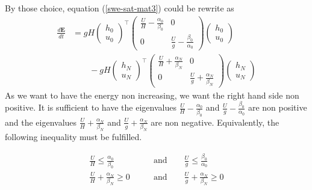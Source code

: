 \documentclass{article}
\theoremstyle{definition}
\begin{document}
    By those choice, equation (\ref{swe-sat-mat3}) could be rewrite as
    \begin{align}
        \frac{d\mathbf{E}}{dt}  &=     gH
        \begin{pmatrix}
            h_0 \\ u_0
        \end{pmatrix}^\top 
        \begin{pmatrix}
        \frac{U}{H} - \frac{\alpha_0}{\beta_0}& 0 \\
        0 & \frac{U}{g} - \frac{\beta_0}{\alpha_0}
        \end{pmatrix}
        \begin{pmatrix}
            h_0 \\ u_0
        \end{pmatrix} \nonumber \\
        & \qquad -gH
        \begin{pmatrix}
            h_N \\ u_N
        \end{pmatrix}^\top 
        \begin{pmatrix}
        \frac{U}{H} +\frac{\alpha_N}{\beta_N}& 0 \\
        0 & \frac{U}{g} + \frac{\alpha_N}{\beta_N}
        \end{pmatrix}
        \begin{pmatrix}
            h_N \\ u_N
        \end{pmatrix}
    \end{align}
    As we want to have the energy non increasing, 
    we want the right hand side non positive. 
    It is sufficient to have the eigenvalues 
    $\frac{U}{H} - \frac{\alpha_0}{\beta_0}$ and 
    $\frac{U}{g} - \frac{\beta_0}{\alpha_0}$ are non positive
    and the eigenvalues
    $\frac{U}{H} +\frac{\alpha_N}{\beta_N}$ and 
    $\frac{U}{g} + \frac{\alpha_N}{\beta_N}$
    are non negative. Equivalently, the following inequality must be fulfilled.

    \begin{align}
        \label{boundarycondition_tau0}        
        \frac{U}{H} \leq \frac{\alpha_0}{\beta_0} \qquad &\text{and} \qquad \frac{U}{g} \leq \frac{\beta_0}{\alpha_0} \\
        \label{boundarycondition_tauN}
        \frac{U}{H} +\frac{\alpha_N}{\beta_N} \geq 0 \qquad &\text{and} \qquad \frac{U}{g} + \frac{\alpha_N}{\beta_N} \geq 0
    \end{align}
\end{document}

